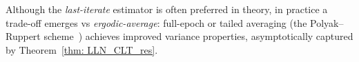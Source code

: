 \begin{draftremark}
Although the \emph{last-iterate} estimator is often preferred in theory, in practice a trade-off emerges vs \emph{ergodic-average}: full-epoch or tailed averaging (the Polyak--Ruppert scheme~\citep{polyak1992acceleration}) achieves improved variance properties, asymptotically captured by Theorem~\ref{thm: LLN_CLT_res}.
\end{draftremark}
\vspace{-1.em}

%
%
